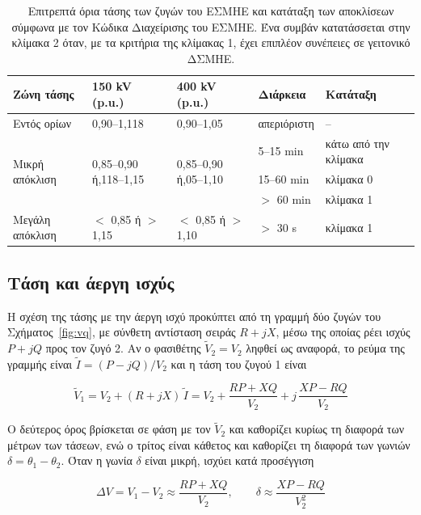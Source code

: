 \begin{table}[!htbp]
\centering
\begin{tabular}{lllll}
\hline
\textbf{Ζώνη τάσης} & \textbf{150 kV (p.u.)} & \textbf{400 kV (p.u.)} & \textbf{Διάρκεια}
& \textbf{Κατάταξη} \\
\hline
Εντός ορίων & 0,90--1,118 & 0,90--1,05 & απεριόριστη & -- \\
\multirow{3}{*}{Μικρή απόκλιση} & \multirow{3}{*}{0,85--0,90 ή\newline 1,118--1,15}
& \multirow{3}{*}{0,85--0,90 ή\newline 1,05--1,10} & 5--15 min & κάτω από την κλίμακα \\
 & & & 15--60 min & κλίμακα 0 \\
 & & & $>$ 60 min & κλίμακα 1 \\
Μεγάλη απόκλιση & $<$ 0,85 ή $>$ 1,15 & $<$ 0,85 ή $>$ 1,10 & $>$ 30 s & κλίμακα 1 \\
\hline
\end{tabular}
\caption{Επιτρεπτά όρια τάσης των ζυγών του ΕΣΜΗΕ και κατάταξη των αποκλίσεων σύμφωνα με τον Κώδικα
Διαχείρισης του ΕΣΜΗΕ. Ένα συμβάν κατατάσσεται στην κλίμακα 2 όταν,
με τα κριτήρια της κλίμακας 1, έχει επιπλέον συνέπειες σε γειτονικό ΔΣΜΗΕ.}
\label{tab:v-limits}
\end{table}

\subsection{Τάση και άεργη ισχύς}
\label{sec:v-q}

Η σχέση της τάσης με την άεργη ισχύ προκύπτει από τη γραμμή δύο ζυγών του
Σχήματος~\ref{fig:vq}, με σύνθετη αντίσταση σειράς $R + jX$, μέσω της οποίας ρέει ισχύς
$P + jQ$ προς τον ζυγό 2. Αν ο φασιθέτης $\tilde{V}_2 = V_2$ ληφθεί ως αναφορά, το ρεύμα της
γραμμής είναι $\tilde{I} = (P - jQ)/V_2$ και η τάση του ζυγού 1 είναι

\begin{equation}
\tilde{V}_1 = V_2 + (R + jX)\,\tilde{I}
= V_2 + \frac{RP + XQ}{V_2} + j\,\frac{XP - RQ}{V_2}
\label{eq:v1phasor}
\end{equation}

Ο δεύτερος όρος βρίσκεται σε φάση με τον $\tilde{V}_2$ και καθορίζει κυρίως τη διαφορά των
μέτρων των τάσεων, ενώ ο τρίτος είναι κάθετος και καθορίζει τη διαφορά των γωνιών
$\delta = \theta_1 - \theta_2$. Όταν η γωνία $\delta$ είναι μικρή, ισχύει κατά προσέγγιση

\begin{equation}
\Delta V = V_1 - V_2 \approx \frac{RP + XQ}{V_2}, \qquad
\delta \approx \frac{XP - RQ}{V_2^2}
\label{eq:dv}
\end{equation}

